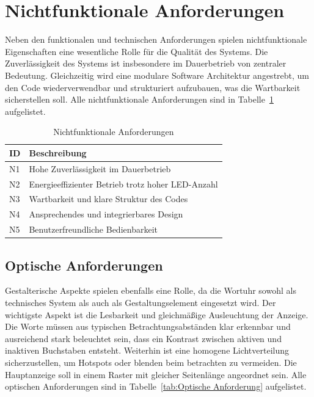 \section{Nichtfunktionale Anforderungen}
Neben den funktionalen und technischen Anforderungen spielen nichtfunktionale Eigenschaften eine wesentliche Rolle für die Qualität des Systems.
Die Zuverlässigkeit des Systems ist insbesondere im Dauerbetrieb von zentraler Bedeutung.
Gleichzeitig wird eine modulare Software Architektur angestrebt, um den Code wiederverwendbar und strukturiert aufzubauen, was die Wartbarkeit sicherstellen soll.
Alle nichtfunktionale Anforderungen sind in Tabelle~\ref{tab:Nichtfunktionale Anforderung} aufgelistet.

\begin{table}[H]
\centering
\begin{tabular}{p{3cm} p{9cm}}
\textbf{ID} & \textbf{Beschreibung} \\
\hline
N1 & Hohe Zuverlässigkeit im Dauerbetrieb \\
N2 & Energieeffizienter Betrieb trotz hoher LED-Anzahl \\
N3 & Wartbarkeit und klare Struktur des Codes \\
N4 & Ansprechendes und integrierbares Design \\
N5 & Benutzerfreundliche Bedienbarkeit \\
\end{tabular}
\caption{Nichtfunktionale Anforderungen}
\label{tab:Nichtfunktionale Anforderung}
\end{table}



\subsection{Optische Anforderungen}
Gestalterische Aspekte spielen ebenfalls eine Rolle, da die Wortuhr sowohl als technisches System als auch als Gestaltungselement eingesetzt wird.
Der wichtigste Aspekt ist die Lesbarkeit und gleichmäßige Ausleuchtung der Anzeige. 
Die Worte müssen aus typischen Betrachtungsabständen klar erkennbar und ausreichend stark beleuchtet sein, dass ein Kontrast zwischen aktiven und inaktiven Buchstaben entsteht.
Weiterhin ist eine homogene Lichtverteilung sicherzustellen, um Hotspots oder blenden beim betrachten zu vermeiden.
Die Hauptanzeige soll in einem Raster mit gleicher Seitenlänge angeordnet sein.
Alle optischen Anforderungen sind in Tabelle~\ref{tab:Optische Anforderung} aufgelistet.

